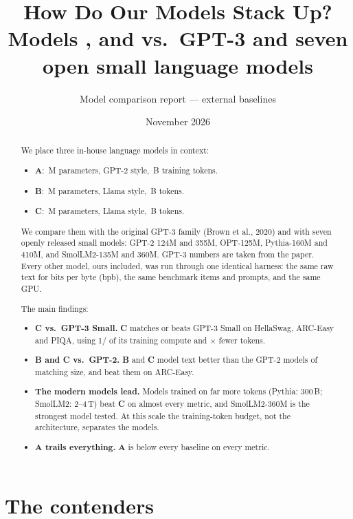 \documentclass[10pt,a4paper]{article}
\title{\textbf{How Do Our Models Stack Up?}\\[2pt]
\large Models \A{}, \B{} and \C{} vs.\ GPT-3 and seven open small language models}
\author{Model comparison report --- external baselines}
\date{November 2026}
\newcommand{\A}{\textcolor{mA}{\textbf{A}}}
\newcommand{\B}{\textcolor{mB}{\textbf{B}}}
\newcommand{\C}{\textcolor{mC}{\textbf{C}}}
\begin{document}
\maketitle

\begin{abstract}
\noindent We place three in-house language models in context:
\begin{itemize}
  \item \A{}: \paramsA\,M parameters, GPT-2 style, \tokensA\,B training tokens.
  \item \B{}: \paramsB\,M parameters, Llama style, \tokensB\,B tokens.
  \item \C{}: \paramsC\,M parameters, Llama style, \tokensC\,B tokens.
\end{itemize}
We compare them with the original GPT-3 family (Brown et al., 2020) and with seven openly released small models: GPT-2 124M and 355M, OPT-125M, Pythia-160M and 410M, and SmolLM2-135M and 360M.
GPT-3 numbers are taken from the paper. Every other model, ours included, was run through one identical harness: the same raw text for bits per byte (bpb), the same benchmark items and prompts, and the same GPU.

The main findings:
\begin{itemize}
  \item \textbf{C vs.\ GPT-3 Small.} \C{} matches or beats GPT-3 Small on HellaSwag, ARC-Easy and PIQA, using 1/\flopsratioCgptS{} of its training compute and \tokratioCgptS$\times$ fewer tokens.
  \item \textbf{B and C vs.\ GPT-2.} \B{} and \C{} model text better than the GPT-2 models of matching size, and beat them on ARC-Easy.
  \item \textbf{The modern models lead.} Models trained on far more tokens (Pythia: 300\,B; SmolLM2: 2--4\,T) beat \C{} on almost every metric, and SmolLM2-360M is the strongest model tested. At this scale the training-token budget, not the architecture, separates the models.
  \item \textbf{A trails everything.} \A{} is below every baseline on every metric.
\end{itemize}
\end{abstract}

\section{The contenders}
\end{document}
